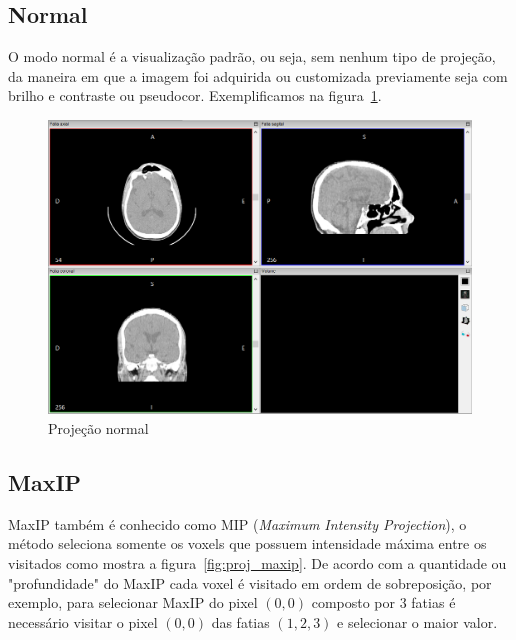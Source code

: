 \subsection{Normal}

O modo normal é a visualização padrão, ou seja, sem nenhum tipo de projeção, da maneira em que a imagem foi adquirida ou customizada previamente seja com brilho e contraste ou pseudocor. Exemplificamos na figura~\ref{fig:proj_normal}.

\begin{figure}[H]
\centering
\includegraphics[scale=0.40]{../user_guide_figures/invesalius_screen/multiplanar_window_pt.png}
\caption{Projeção normal}
\label{fig:proj_normal}
\end{figure}

\subsection{MaxIP}
\label{sec:max_ip}
MaxIP também é conhecido como MIP (\textit{Maximum Intensity Projection}), o método seleciona somente os voxels que possuem intensidade máxima entre os visitados como mostra a figura~\ref{fig:proj_maxip}. De acordo com a quantidade ou "profundidade" do MaxIP cada voxel é visitado em ordem de sobreposição, por exemplo, para selecionar MaxIP do pixel $(0,0)$ composto por 3 fatias é necessário visitar o pixel $(0,0)$ das fatias $(1,2,3)$ e selecionar o maior valor.

